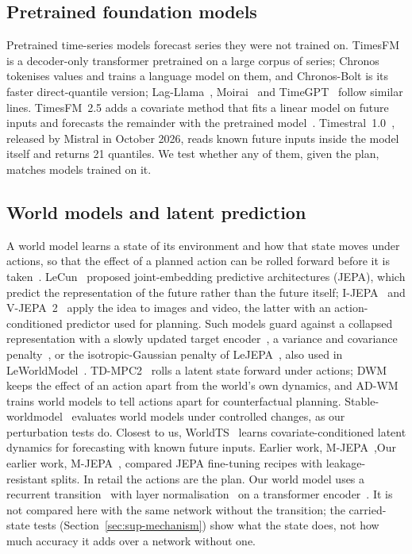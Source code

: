 \subsection{Pretrained foundation models}

Pretrained time-series models forecast series they were not trained on.
TimesFM~\cite{timesfm} is a decoder-only transformer pretrained on a large
corpus of series; Chronos~\cite{chronos} tokenises values and trains a language
model on them, and Chronos-Bolt is its faster direct-quantile version;
Lag-Llama~\cite{lagllama}, Moirai~\cite{moirai} and TimeGPT~\cite{timegpt}
follow similar lines. TimesFM~2.5 adds a covariate method that fits a linear
model on future inputs and forecasts the remainder with the pretrained
model~\cite{timesfm25}. Timestral~1.0~\cite{timestral}, released by Mistral in
October 2026, reads known future inputs inside the model itself and returns
21 quantiles. We test whether any of them, given the plan, matches models
trained on it.

\subsection{World models and latent prediction}

A world model learns a state of its environment and how that state moves under
actions, so that the effect of a planned action can be rolled forward before it
is taken~\cite{worldmodels,planet,dreamerv3}. LeCun~\cite{lecun2022} proposed
joint-embedding predictive architectures (JEPA), which predict the
representation of the future rather than the future itself; I-JEPA~\cite{ijepa}
and V-JEPA~2~\cite{vjepa2} apply the idea to images and video, the latter with
an action-conditioned predictor used for planning. Such models guard against a
collapsed representation with a slowly updated target encoder~\cite{byol}, a
variance and covariance penalty~\cite{vicreg}, or the isotropic-Gaussian penalty
of LeJEPA~\cite{lejepa}, also used in LeWorldModel~\cite{leworldmodel}.
TD-MPC2~\cite{tdmpc2} rolls a latent state forward under actions; DWM~\cite{dwm}
keeps the effect of an action apart from the world's own dynamics, and
AD-WM~\cite{adwm} trains world models to tell actions apart for counterfactual
planning. Stable-worldmodel~\cite{stablewm} evaluates world models under
controlled changes, as our perturbation tests do. Closest to us,
WorldTS~\cite{worldts} learns covariate-conditioned latent dynamics for
forecasting with known future inputs. \ifjournal Earlier work, M-JEPA~\cite{mjepa},\else Our earlier work, M-JEPA~\cite{mjepa},\fi{}
compared JEPA fine-tuning recipes with leakage-resistant splits. In retail the
actions are the plan. Our world model uses a recurrent transition~\cite{gru}
with layer normalisation~\cite{layernorm} on a transformer
encoder~\cite{transformer}. It is not compared here with the same network
without the transition; the carried-state tests (Section~\ref{sec:sup-mechanism})
show what the state does, not how much accuracy it adds over a network without one.

